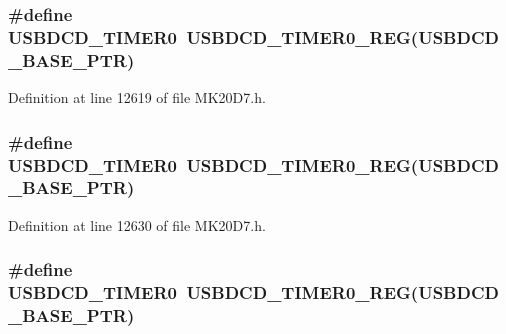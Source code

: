 \subsubsection[{\texorpdfstring{U\+S\+B\+D\+C\+D\+\_\+\+T\+I\+M\+E\+R0}{USBDCD_TIMER0}}]{\setlength{\rightskip}{0pt plus 5cm}\#define U\+S\+B\+D\+C\+D\+\_\+\+T\+I\+M\+E\+R0~{\bf U\+S\+B\+D\+C\+D\+\_\+\+T\+I\+M\+E\+R0\+\_\+\+R\+EG}({\bf U\+S\+B\+D\+C\+D\+\_\+\+B\+A\+S\+E\+\_\+\+P\+TR})}\hypertarget{group___u_s_b_d_c_d___register___accessor___macros_ga696142965d4e1a121400c0f9e42e9c30}{}\label{group___u_s_b_d_c_d___register___accessor___macros_ga696142965d4e1a121400c0f9e42e9c30}


Definition at line 12619 of file M\+K20\+D7.\+h.

\subsubsection[{\texorpdfstring{U\+S\+B\+D\+C\+D\+\_\+\+T\+I\+M\+E\+R0}{USBDCD_TIMER0}}]{\setlength{\rightskip}{0pt plus 5cm}\#define U\+S\+B\+D\+C\+D\+\_\+\+T\+I\+M\+E\+R0~{\bf U\+S\+B\+D\+C\+D\+\_\+\+T\+I\+M\+E\+R0\+\_\+\+R\+EG}({\bf U\+S\+B\+D\+C\+D\+\_\+\+B\+A\+S\+E\+\_\+\+P\+TR})}\hypertarget{group___u_s_b_d_c_d___register___accessor___macros_ga696142965d4e1a121400c0f9e42e9c30}{}\label{group___u_s_b_d_c_d___register___accessor___macros_ga696142965d4e1a121400c0f9e42e9c30}


Definition at line 12630 of file M\+K20\+D7.\+h.

\subsubsection[{\texorpdfstring{U\+S\+B\+D\+C\+D\+\_\+\+T\+I\+M\+E\+R0}{USBDCD_TIMER0}}]{\setlength{\rightskip}{0pt plus 5cm}\#define U\+S\+B\+D\+C\+D\+\_\+\+T\+I\+M\+E\+R0~{\bf U\+S\+B\+D\+C\+D\+\_\+\+T\+I\+M\+E\+R0\+\_\+\+R\+EG}({\bf U\+S\+B\+D\+C\+D\+\_\+\+B\+A\+S\+E\+\_\+\+P\+TR})}\hypertarget{group___u_s_b_d_c_d___register___accessor___macros_ga696142965d4e1a121400c0f9e42e9c30}{}\label{group___u_s_b_d_c_d___register___accessor___macros_ga696142965d4e1a121400c0f9e42e9c30}


